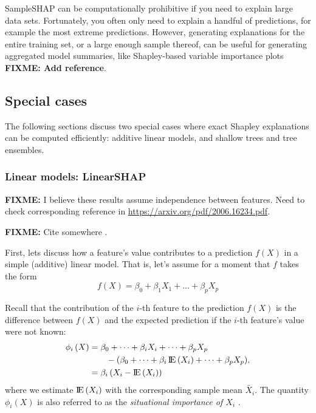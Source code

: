SampleSHAP can be computationally prohibitive if you need to explain
large data sets. Fortunately, you often only need to explain a handful
of predictions, for example the most extreme predictions. However,
generating explanations for the entire training set, or a large enough
sample thereof, can be useful for generating aggregated model summaries,
like Shapley-based variable importance plots \textbf{FIXME: Add
reference}.

\hypertarget{special-cases}{%
\subsection{Special cases}\label{special-cases}}

The following sections discuss two special cases where exact Shapley
explanations can be computed efficiently: additive linear models, and
shallow trees and tree ensembles.

\hypertarget{linear-models-linearshap}{%
\subsubsection{Linear models:
LinearSHAP}\label{linear-models-linearshap}}

\textbf{FIXME:} I believe these results assume independence between
features. Need to check corresponding reference in
\url{https://arxiv.org/pdf/2006.16234.pdf}.

\textbf{FIXME:} Cite somewhere \cite{strumbelj-2014-explaining}.

First, lets discuss how a feature's value contributes to a prediction
\(f\left(X\right)\) in a simple (additive) linear model. That is, let's
assume for a moment that \(f\) takes the form \begin{equation}
\nonumber
  f\left(X\right) = \beta_0 + \beta_1 X_1 + \dots + \beta_p X_p
\end{equation}

Recall that the contribution of the \(i\)-th feature to the prediction
\(f\left(X\right)\) is the difference between \(f\left(X\right)\) and
the expected prediction if the \(i\)-th feature's value were not known:
\begin{equation}
\nonumber
\begin{split}
  \phi_i\left(X\right) &= \beta_0 + \dots + \beta_i X_i + \dots + \beta_p X_p \\ &\quad\quad - \left(\beta_0 + \dots + \beta_i \E\left(X_i\right) + \dots + \beta_p X_p\right) \\
  &= \beta_i \left(X_i - \E\left(X_i\right)\right)
\end{split},
\end{equation} where we estimate \(\E\left(X_i\right)\) with the
corresponding sample mean \(\bar{X}_i\). The quantity
\(\phi_i\left(X\right)\) is also referred to as the
\emph{situational importance of $X_i$} \citep{achen-1982-interpreting}.

